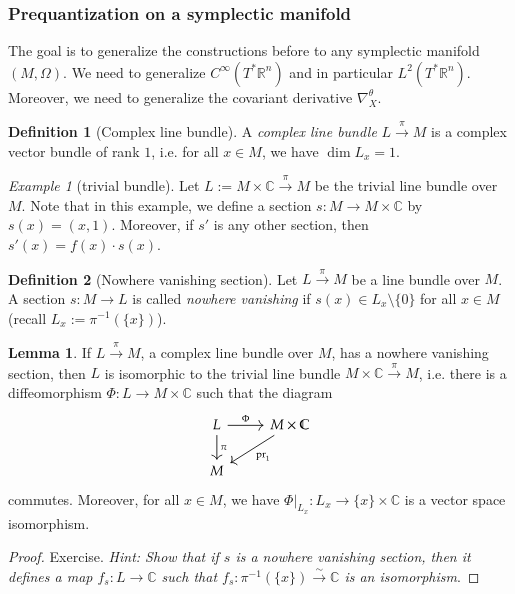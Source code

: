 \documentclass[11pt]{amsart}
\numberwithin{equation}{section}
\theoremstyle{plain}
\theoremstyle{definition}
\newtheorem{defn}{Definition}[subsection]
\newtheorem{lem}{Lemma}[subsection]
\theoremstyle{remark}
\newtheorem{ex}{Example}[subsection]
\newcommand{\R}{\mathbb{R}}
\begin{document}
\subsubsection{Prequantization on a symplectic manifold}
The goal is to generalize the constructions before to any symplectic manifold $(M,\Omega)$. We need to generalize $C^\infty(T^*\R^n)$ and in particular $L^2(T^*\R^n)$. Moreover, we need to generalize the covariant derivative $\nabla^\theta_X$. 

\begin{defn}[Complex line bundle]
A \emph{complex line bundle} $L\xrightarrow{\pi}M$ is a complex vector bundle of rank $1$, i.e. for all $x\in M$, we have $\dim L_x=1$. 
\end{defn}

\begin{ex}[trivial bundle]
Let $L:=M\times\mathbb{C}\xrightarrow{\pi}M$ be the trivial line bundle over $M$. Note that in this example, we define a section $s\colon M\to M\times \mathbb{C}$ by $s(x)=(x,1)$. Moreover, if $s'$ is any other section, then $s'(x)=f(x)\cdot s(x)$. 
\end{ex}


\begin{defn}[Nowhere vanishing section]
Let $L\xrightarrow{\pi}M$ be a line bundle over $M$. A section $s\colon M\to L$ is called \emph{nowhere vanishing} if $s(x)\in L_x\setminus\{0\}$ for all $x\in M$ (recall $L_x:=\pi^{-1}(\{x\})$).
\end{defn}

\begin{lem}
If $L\xrightarrow{\pi} M$, a complex line bundle over $M$, has a nowhere vanishing section, then $L$ is isomorphic to the trivial line bundle $M\times\mathbb{C}\xrightarrow{\pi}M$, i.e. there is a diffeomorphism $\Phi\colon L\to M\times\mathbb{C}$ such that the diagram 
\[
\begin{tikzcd}
L\arrow[d,"\pi"]\arrow[r,"\Phi"]&M\times \mathbb{C}\arrow[dl,"\mathrm{pr}_1"]\\
M&
\end{tikzcd}
\]
commutes. Moreover, for all $x\in M$, we have $\Phi\big|_{L_x}\colon L_x\to \{x\}\times\mathbb{C}$ is a vector space isomorphism.
\end{lem}
\begin{proof}
Exercise. \emph{Hint: Show that if $s$ is a nowhere vanishing section, then it defines a map $f_s\colon L\to \mathbb{C}$ such that $f_s\colon \pi^{-1}(\{x\})\xrightarrow{\sim} \mathbb{C}$ is an isomorphism}.
\end{proof}
\end{document}
